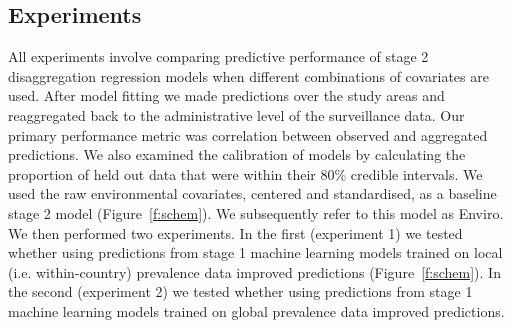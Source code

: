 \documentclass[review]{elsarticle}
\begin{document}
\subsection{Experiments}



All experiments involve comparing predictive performance of stage 2 disaggregation regression models when different combinations of covariates are used.
After model fitting we made predictions over the study areas and reaggregated back to the administrative level of the surveillance data.
Our primary performance metric was correlation between observed and aggregated predictions.
We also examined the calibration of models by calculating the proportion of held out data that were within their 80\% credible intervals.
We used the raw environmental covariates, centered and standardised, as a baseline stage 2 model (Figure~\ref{f:schem}).
We subsequently refer to this model as Enviro.
We then performed two experiments.
In the first (experiment 1) we tested whether using predictions from stage 1 machine learning models trained on local (i.e. within-country) prevalence data improved predictions (Figure~\ref{f:schem}).
In the second (experiment 2) we tested whether using predictions from stage 1 machine learning models trained on global prevalence data improved predictions.
\end{document}
